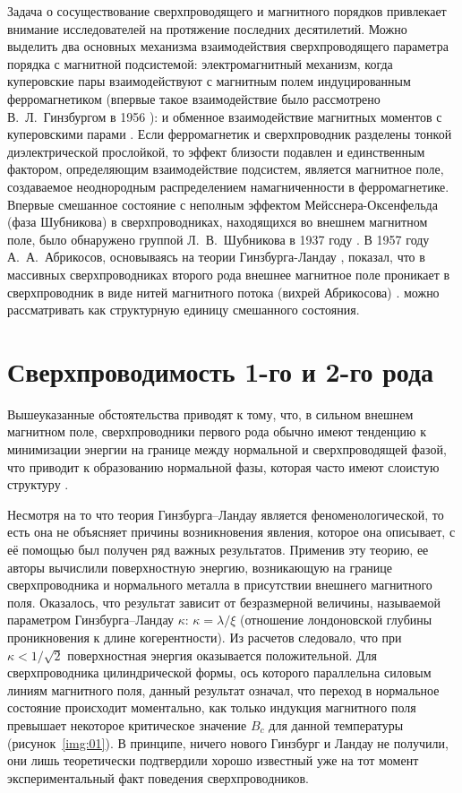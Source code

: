 Задача о сосуществование сверхпроводящего и магнитного порядков привлекает 
внимание исследователей на протяжение последних десятилетий. Можно выделить 
два основных механизма взаимодействия сверхпроводящего параметра порядка с 
магнитной подсистемой: электромагнитный механизм, когда куперовские пары 
взаимодействуют с магнитным полем индуцированным ферромагнетиком (впервые 
такое взаимодействие было рассмотрено В.~Л.~Гинзбургом в 1956 
\cite{ginzburg}): и обменное взаимодействие магнитных моментов с куперовскими 
парами \cite{buzdin,bulaev}. Если ферромагнетик и сверхпроводник разделены 
тонкой диэлектрической прослойкой, то эффект близости подавлен и единственным 
фактором, определяющим взаимодействие подсистем, является магнитное поле, 
создаваемое неоднородным распределением намагниченности в ферромагнетике.
Впервые смешанное состояние с неполным эффектом Мейсснера-Оксенфельда 
(фаза Шубникова) в сверхпроводниках, находящихся во внешнем магнитном поле, 
было обнаружено группой Л.~В.~Шубникова в 1937 году \cite{shubnikov}. В 1957 
году А.~А.~Абрикосов, основываясь на теории Гинзбурга-Ландау 
\cite{ginzburg-landau}, показал, что в массивных сверхпроводниках второго рода 
внешнее магнитное поле проникает в сверхпроводник в виде нитей магнитного 
потока (вихрей Абрикосова) \cite{abrikosov}. можно рассматривать как 
структурную единицу смешанного состояния.

\section{Сверхпроводимость 1-го и 2-го рода}

Вышеуказанные обстоятельства приводят к тому, что, в сильном внешнем магнитном 
поле, сверхпроводники первого рода обычно имеют тенденцию к минимизации 
энергии на границе между нормальной и сверхпроводящей фазой, что приводит к 
образованию нормальной фазы, которая часто имеют слоистую структуру 
\cite{bib:4}. 

Несмотря на то что теория Гинзбурга–Ландау является феноменологической, то 
есть она не объясняет причины возникновения явления, которое она описывает, с 
её помощью был получен ряд важных результатов. Применив эту теорию, ее авторы 
вычислили поверхностную энергию, возникающую на границе сверхпроводника и 
нормального металла в присутствии внешнего магнитного поля. Оказалось, что 
результат зависит от безразмерной величины, называемой параметром 
Гинзбурга–Ландау \( \kappa \): \( \kappa = \lambda/\xi \) (отношение 
лондоновской глубины проникновения к длине когерентности). Из расчетов 
следовало, что при \( \kappa < 1/\sqrt{2} \) поверхностная энергия оказывается 
положительной. Для сверхпроводника цилиндрической формы, ось которого 
параллельна силовым линиям магнитного поля, данный результат означал, что 
переход в нормальное состояние происходит моментально, как только индукция 
магнитного поля превышает некоторое критическое значение \( B_c \) для данной 
температуры (рисунок~\ref{img:01}). В принципе, ничего нового Гинзбург и 
Ландау не получили, они лишь теоретически подтвердили хорошо известный уже на 
тот момент экспериментальный факт поведения сверхпроводников.

